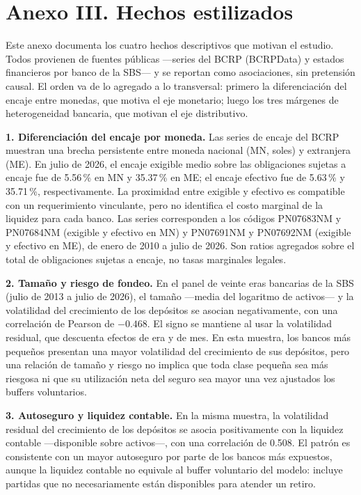 \documentclass[11pt,a4paper]{article}
\begin{document}
\clearpage
\section{Anexo III. Hechos estilizados}\label{sec:anexo-hechos}
Este anexo documenta los cuatro hechos descriptivos que motivan el estudio. Todos provienen de fuentes públicas ---series del BCRP (BCRPData) y estados financieros por banco de la SBS--- y se reportan como asociaciones, sin pretensión causal. El orden va de lo agregado a lo transversal: primero la diferenciación del encaje entre monedas, que motiva el eje monetario; luego los tres márgenes de heterogeneidad bancaria, que motivan el eje distributivo.

\noindent\textbf{1. Diferenciación del encaje por moneda.} Las series de encaje del BCRP muestran una brecha persistente entre moneda nacional (MN, soles) y extranjera (ME). En julio de 2026, el encaje exigible medio sobre las obligaciones sujetas a encaje fue de 5.56\,\% en MN y 35.37\,\% en ME; el encaje efectivo fue de 5.63\,\% y 35.71\,\%, respectivamente. La proximidad entre exigible y efectivo es compatible con un requerimiento vinculante, pero no identifica el costo marginal de la liquidez para cada banco. Las series corresponden a los códigos PN07683NM y PN07684NM (exigible y efectivo en MN) y PN07691NM y PN07692NM (exigible y efectivo en ME), de enero de 2010 a julio de 2026. Son ratios agregados sobre el total de obligaciones sujetas a encaje, no tasas marginales legales.

\noindent\textbf{2. Tamaño y riesgo de fondeo.} En el panel de veinte eras bancarias de la SBS (julio de 2013 a julio de 2026), el tamaño ---media del logaritmo de activos--- y la volatilidad del crecimiento de los depósitos se asocian negativamente, con una correlación de Pearson de $-0.468$. El signo se mantiene al usar la volatilidad residual, que descuenta efectos de era y de mes. En esta muestra, los bancos más pequeños presentan una mayor volatilidad del crecimiento de sus depósitos, pero una relación de tamaño y riesgo no implica que toda clase pequeña sea más riesgosa ni que su utilización neta del seguro sea mayor una vez ajustados los buffers voluntarios.

\noindent\textbf{3. Autoseguro y liquidez contable.} En la misma muestra, la volatilidad residual del crecimiento de los depósitos se asocia positivamente con la liquidez contable ---disponible sobre activos---, con una correlación de 0.508. El patrón es consistente con un mayor autoseguro por parte de los bancos más expuestos, aunque la liquidez contable no equivale al buffer voluntario del modelo: incluye partidas que no necesariamente están disponibles para atender un retiro.
\end{document}
